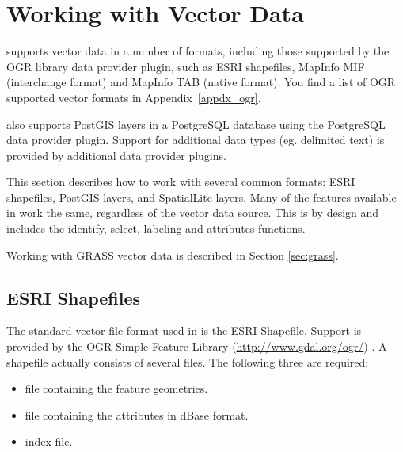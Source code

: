 
\chapter{Working with Vector Data}\label{label_workingvector}


\qg supports vector data in a number of formats, including those
supported by the OGR library data provider plugin, such as ESRI shapefiles,
MapInfo MIF (interchange format)
and MapInfo TAB (native format).
You find a list of OGR supported vector formats in Appendix~\ref{appdx_ogr}.

\qg also supports PostGIS layers 
in a PostgreSQL database using the PostgreSQL data provider plugin.
Support for additional data types (eg. delimited text) is provided by 
additional data provider plugins.

This section describes how to work with several common formats:
ESRI shapefiles, PostGIS layers, and SpatialLite layers. Many of the
features available in \qg work the same, regardless of the vector data source.
This is by design and includes the identify, select, labeling and attributes
functions.

Working with GRASS vector data is described in Section \ref{sec:grass}.

\section{ESRI Shapefiles}

The standard vector file format used in \qg is the ESRI Shapefile. Support 
is provided by the OGR Simple Feature Library (\url{http://www.gdal.org/ogr/})
. A shapefile actually consists of several files. The following three are required:

\begin{itemize}[label=--]
\item {} file containing the feature geometries.
\item {} file containing the attributes in dBase format.
\item {} index file.
\end{itemize}

